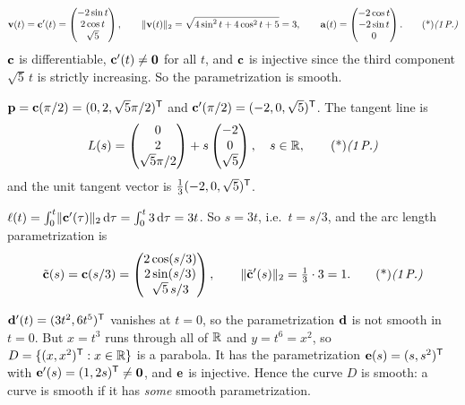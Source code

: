 \begin{solution}
\[
\vb v(t)=\vb c'(t)=\begin{pmatrix}-2\sin t\\2\cos t\\\sqrt5\end{pmatrix},\qquad
\norm{\vb v(t)}_2=\sqrt{4\sin^2t+4\cos^2t+5}=3,\qquad
\vb a(t)=\begin{pmatrix}-2\cos t\\-2\sin t\\0\end{pmatrix}.\ptd{1}
\]
$\mathbf{c}$ is differentiable, $\mathbf{c}'(t)\neq\mathbf{0}$ for all $t$, and $\mathbf{c}$ is injective since the third component $\sqrt5\,t$ is strictly increasing. So the parametrization is smooth. 

 $\mathbf{p}=\mathbf{c}(\pi/2)=(0,2,\sqrt5\pi/2)^{\mathsf{T}}$ and $\mathbf{c}'(\pi/2)=(-2,0,\sqrt5)^{\mathsf{T}}$. The tangent line is
\[
L(s)=\begin{pmatrix}0\\2\\\sqrt5\pi/2\end{pmatrix}+s\begin{pmatrix}-2\\0\\\sqrt5\end{pmatrix},\quad s\in\R,\ptd{1}
\]
and the unit tangent vector is $\frac13(-2,0,\sqrt5)^{\mathsf{T}}$. 

 $\ell(t)=\int_0^t\lVert \mathbf{c}'(\tau)\rVert_2\,\mathrm{d}\tau=\int_0^t3\,\mathrm{d}\tau=3t$. 
So $s=3t$, i.e.\ $t=s/3$, and the arc length parametrization is
\[
\tilde{\vb c}(s)=\vb c(s/3)=\begin{pmatrix}2\cos(s/3)\\2\sin(s/3)\\\sqrt5\,s/3\end{pmatrix},\qquad \norm{\tilde{\vb c}'(s)}_2=\tfrac13\cdot3=1.\ptd{1}
\]

 $\mathbf{d}'(t)=(3t^2,6t^5)^{\mathsf{T}}$ vanishes at $t=0$, so the parametrization $\mathbf{d}$ is not smooth in $t=0$. 
But $x=t^3$ runs through all of $\mathbb{R}$ and $y=t^6=x^2$, so $D=\{(x,x^2)^{\mathsf{T}}:x\in\mathbb{R}\}$ is a parabola. It has the parametrization $\mathbf{e}(s)=(s,s^2)^{\mathsf{T}}$ with $\mathbf{e}'(s)=(1,2s)^{\mathsf{T}}\neq\mathbf{0}$, and $\mathbf{e}$ is injective. Hence the curve $D$ is smooth: a curve is smooth if it has \emph{some} smooth parametrization. 


\end{solution}
